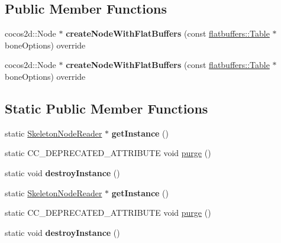 \subsection*{Public Member Functions}
\begin{DoxyCompactItemize}
\item 
\mbox{\label{classSkeletonNodeReader_a3b603d6b8a262d4ef64345bf1f0b8658}} 
cocos2d\+::\+Node $\ast$ {\bfseries create\+Node\+With\+Flat\+Buffers} (const \hyperlink{classflatbuffers_1_1Table}{flatbuffers\+::\+Table} $\ast$bone\+Options) override
\item 
\mbox{\label{classSkeletonNodeReader_a3fd4e32d5ca37ed9f5975f99b3a79b87}} 
cocos2d\+::\+Node $\ast$ {\bfseries create\+Node\+With\+Flat\+Buffers} (const \hyperlink{classflatbuffers_1_1Table}{flatbuffers\+::\+Table} $\ast$bone\+Options) override
\end{DoxyCompactItemize}
\subsection*{Static Public Member Functions}
\begin{DoxyCompactItemize}
\item 
\mbox{\label{classSkeletonNodeReader_a34df0c19630b8abeba4aa8e8605b906c}} 
static \hyperlink{classSkeletonNodeReader}{Skeleton\+Node\+Reader} $\ast$ {\bfseries get\+Instance} ()
\item 
static C\+C\+\_\+\+D\+E\+P\+R\+E\+C\+A\+T\+E\+D\+\_\+\+A\+T\+T\+R\+I\+B\+U\+TE void \hyperlink{classSkeletonNodeReader_abbdbf89e485d6b31726c83bb1fa0904a}{purge} ()
\item 
\mbox{\label{classSkeletonNodeReader_a6f3f16dbf34cf0d7f617e8eab3d6ac4a}} 
static void {\bfseries destroy\+Instance} ()
\item 
\mbox{\label{classSkeletonNodeReader_a605969a6339bab69360e32275d73b1b9}} 
static \hyperlink{classSkeletonNodeReader}{Skeleton\+Node\+Reader} $\ast$ {\bfseries get\+Instance} ()
\item 
static C\+C\+\_\+\+D\+E\+P\+R\+E\+C\+A\+T\+E\+D\+\_\+\+A\+T\+T\+R\+I\+B\+U\+TE void \hyperlink{classSkeletonNodeReader_abbdbf89e485d6b31726c83bb1fa0904a}{purge} ()
\item 
\mbox{\label{classSkeletonNodeReader_a630bf3ce1f22a1a5303d6ada6de09a7f}} 
static void {\bfseries destroy\+Instance} ()
\end{DoxyCompactItemize}


